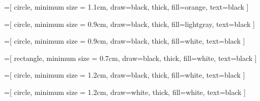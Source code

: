 
\usepackage{tikz}

\usetikzlibrary{graphs}
\usetikzlibrary{shapes}
\usetikzlibrary{arrows.meta,arrows}

%
%

\newcommand{\drawinvisiblegraphline}{
    \draw [color=white]}

\newcommand{\drawgraphlinebigarrow}{
    \draw [-{Stealth[length=2mm,width=2mm]}]}

\newcommand{\drawgraphdashedlinebigarrow}{
    \draw [-{Stealth[length=2mm,width=2mm]},dashed]}


=[
    circle,
    minimum size = 1.1cm,
    draw=black,
    thick,
    fill=orange,
    text=black
]

=[
    circle,
    minimum size = 0.9cm,
    draw=black,
    thick,
    fill=lightgray,
    text=black
]


=[
    circle,
    minimum size = 0.9cm,
    draw=black,
    thick,
    fill=white,
    text=black
]

=[
    rectangle,
    minimum size = 0.7cm,
    draw=black,
    thick,
    fill=white,
    text=black
]

=[
    circle,
    minimum size = 1.2cm,
    draw=black,
    thick,
    fill=white,
    text=black
]

=[
    circle,
    minimum size = 1.2cm,
    draw=white,
    thick,
    fill=white,
    text=black
]
